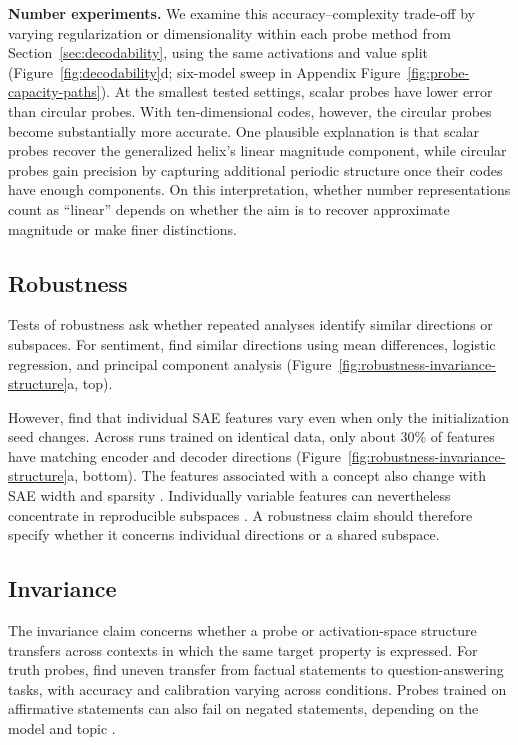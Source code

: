 \documentclass[11pt]{article}
\begin{document}
\textbf{Number experiments.} We examine this accuracy--complexity trade-off by varying regularization or dimensionality within each probe method from Section~\ref{sec:decodability}, using the same activations and value split (Figure~\ref{fig:decodability}d; six-model sweep in Appendix Figure~\ref{fig:probe-capacity-paths}).
At the smallest tested settings, scalar probes have lower error than circular probes.
With ten-dimensional codes, however, the circular probes become substantially more accurate.
One plausible explanation is that scalar probes recover the generalized helix's linear magnitude component, while circular probes gain precision by capturing additional periodic structure once their codes have enough components.
On this interpretation, whether number representations count as ``linear'' depends on whether the aim is to recover approximate magnitude or make finer distinctions.

\subsection{Robustness}

Tests of robustness ask whether repeated analyses identify similar directions or subspaces.
For sentiment, \citet{tigges2023linear} find similar directions using mean differences, logistic regression, and principal component analysis (Figure~\ref{fig:robustness-invariance-structure}a, top).

However, \citet{paulo2026sparse} find that individual SAE features vary even when only the initialization seed changes.
Across runs trained on identical data, only about 30\% of features have matching encoder and decoder directions (Figure~\ref{fig:robustness-invariance-structure}a, bottom).
The features associated with a concept also change with SAE width and sparsity \citep{chanin2025absorption}.
Individually variable features can nevertheless concentrate in reproducible subspaces \citep{gerasimov2026unstable}.
A robustness claim should therefore specify whether it concerns individual directions or a shared subspace.

\subsection{Invariance}

The invariance claim concerns whether a probe or activation-space structure transfers across contexts in which the same target property is expressed.
For truth probes, \citet{bao2025probing} find uneven transfer from factual statements to question-answering tasks, with accuracy and calibration varying across conditions.
Probes trained on affirmative statements can also fail on negated statements, depending on the model and topic \citep{bao2025probing}.
\end{document}
